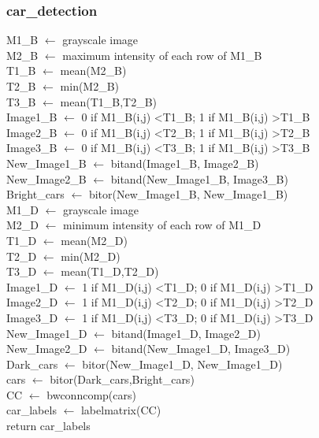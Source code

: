 \documentclass[12pt]{article}
\begin{document}
\subsubsection*{car\_detection}
\begin{addmargin}[12em]{1em}
	M1\_B $\leftarrow$ grayscale image \\
	M2\_B $\leftarrow$ maximum intensity of each row of M1\_B \\
	T1\_B $\leftarrow$ mean(M2\_B) \\
	T2\_B $\leftarrow$ min(M2\_B) \\
	T3\_B $\leftarrow$ mean(T1\_B,T2\_B) \\
	Image1\_B $\leftarrow$ 0 if M1\_B(i,j) \textless T1\_B; 1 if M1\_B(i,j) \textgreater T1\_B \\
	Image2\_B $\leftarrow$ 0 if M1\_B(i,j) \textless T2\_B; 1 if M1\_B(i,j) \textgreater T2\_B \\
	Image3\_B $\leftarrow$ 0 if M1\_B(i,j) \textless T3\_B; 1 if M1\_B(i,j) \textgreater T3\_B \\
	New\_Image1\_B $\leftarrow$ bitand(Image1\_B, Image2\_B) \\
	New\_Image2\_B $\leftarrow$ bitand(New\_Image1\_B, Image3\_B) \\
	Bright\_cars $\leftarrow$ bitor(New\_Image1\_B, New\_Image1\_B) \\
	M1\_D $\leftarrow$ grayscale image \\
	M2\_D $\leftarrow$ minimum intensity of each row of M1\_D \\
	T1\_D $\leftarrow$ mean(M2\_D) \\
	T2\_D $\leftarrow$ min(M2\_D) \\
	T3\_D $\leftarrow$ mean(T1\_D,T2\_D) \\
	Image1\_D $\leftarrow$ 1 if M1\_D(i,j) \textless T1\_D; 0 if M1\_D(i,j) \textgreater T1\_D \\
	Image2\_D $\leftarrow$ 1 if M1\_D(i,j) \textless T2\_D; 0 if M1\_D(i,j) \textgreater T2\_D \\
	Image3\_D $\leftarrow$ 1 if M1\_D(i,j) \textless T3\_D; 0 if M1\_D(i,j) \textgreater T3\_D \\
	New\_Image1\_D $\leftarrow$ bitand(Image1\_D, Image2\_D) \\
	New\_Image2\_D $\leftarrow$ bitand(New\_Image1\_D, Image3\_D) \\
	Dark\_cars $\leftarrow$ bitor(New\_Image1\_D, New\_Image1\_D) \\
	cars $\leftarrow$  bitor(Dark\_cars,Bright\_cars) \\
	CC $\leftarrow$ bwconncomp(cars) \\
	car\_labels $\leftarrow$ labelmatrix(CC) \\
	return car\_labels \\
\end{addmargin}
\end{document}
